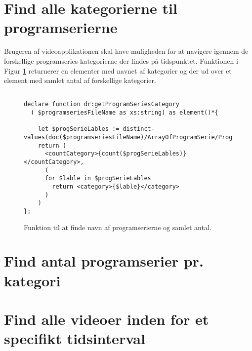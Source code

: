 
\section{Find alle kategorierne til programserierne}
Brugeren af videoapplikationen skal have muligheden for at navigere igennem de forskellige 
programseries kategorierne der findes på tidspunktet. Funktionen i Figur \ref{xquerySearch:getProgramSeriesCategory} returnerer en elementer med navnet af kategorier og der ud over et element med samlet antal af forskellige kategorier. 

\begin{figure}[ht]
\begin{lstlisting}[style=FAKE_XQUERY, language=XQUERY]

declare function dr:getProgramSeriesCategory
  ( $programseriesFileName as xs:string) as element()*{
    
    let $progSerieLables := distinct-values(doc($programseriesFileName)/ArrayOfProgramSerie/ProgramSerie/Labels/string/text())
    return (
      <countCategory>{count($progSerieLables)}</countCategory>,
      (
      for $lable in $progSerieLables
        return <category>{$lable}</category>
      )
    )
};

\end{lstlisting}
\caption{Funktion til at finde navn af programserierne og samlet antal.}
\label{xquerySearch:getProgramSeriesCategory}
\end{figure}




\section{Find antal programserier pr. kategori}




\section{Find alle videoer inden for et specifikt tidsinterval}


